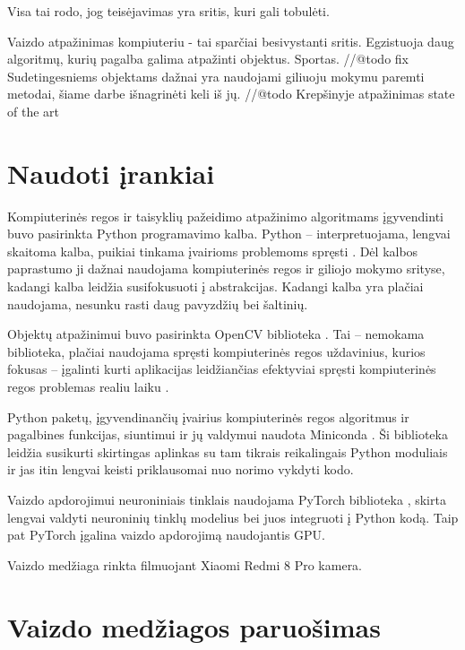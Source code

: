 \documentclass{VUMIFPSbakalaurinis}
\begin{document}
Visa tai rodo, jog teisėjavimas yra sritis, kuri gali tobulėti.  


Vaizdo atpažinimas kompiuteriu - tai sparčiai besivystanti sritis. Egzistuoja daug algoritmų, kurių pagalba galima atpažinti objektus. Sportas. //@todo fix Sudetingesniems objektams dažnai yra naudojami giliuoju mokymu paremti metodai, šiame darbe išnagrinėti keli iš jų.  
//@todo Krepšinyje atpažinimas state of the art

\section{Naudoti įrankiai}

Kompiuterinės regos ir taisyklių pažeidimo atpažinimo algoritmams įgyvendinti buvo pasirinkta Python programavimo kalba. Python – interpretuojama, lengvai skaitoma kalba, puikiai tinkama įvairioms problemoms spręsti \cite{Python}. Dėl kalbos paprastumo ji dažnai naudojama kompiuterinės regos ir giliojo mokymo srityse, kadangi kalba leidžia susifokusuoti į abstrakcijas. Kadangi kalba yra plačiai naudojama, nesunku rasti daug pavyzdžių bei šaltinių. 

Objektų atpažinimui buvo pasirinkta OpenCV biblioteka \cite{opencv}. Tai – nemokama biblioteka, plačiai naudojama spręsti kompiuterinės regos uždavinius, kurios fokusas – įgalinti kurti aplikacijas leidžiančias efektyviai spręsti kompiuterinės regos problemas realiu laiku \cite{BradskiOpenCV}.

Python paketų, įgyvendinančių įvairius kompiuterinės regos algoritmus ir pagalbines funkcijas, siuntimui ir jų valdymui naudota Miniconda \cite{conda}. Ši biblioteka leidžia susikurti skirtingas aplinkas su tam tikrais reikalingais Python moduliais ir jas itin lengvai keisti priklausomai nuo norimo vykdyti kodo.

Vaizdo apdorojimui neuroniniais tinklais naudojama PyTorch biblioteka \cite{pytorch}, skirta lengvai valdyti neuroninių tinklų modelius bei juos integruoti į Python kodą. Taip pat PyTorch įgalina vaizdo apdorojimą naudojantis GPU. 

Vaizdo medžiaga rinkta filmuojant Xiaomi Redmi 8 Pro kamera.  

\section{Vaizdo medžiagos paruošimas}
\end{document}

